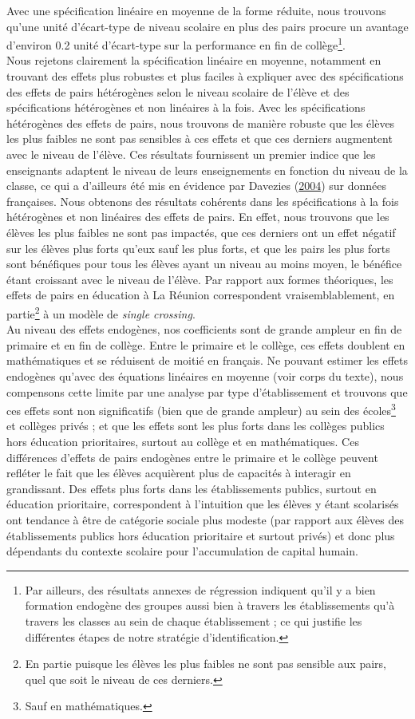 \documentclass[
]{book}
\begin{document}
\quad Avec une spécification linéaire en moyenne de la forme réduite, nous trouvons qu'une unité d'écart-type de niveau scolaire en plus des pairs procure un avantage d'environ 0.2 unité d'écart-type sur la performance en fin de collège\footnote{Par ailleurs, des résultats annexes de régression indiquent qu'il y a bien formation endogène des groupes aussi bien à travers les établissements qu'à travers les classes au sein de chaque établissement ; ce qui justifie les différentes étapes de notre stratégie d'identification.}.\\
Nous rejetons clairement la spécification linéaire en moyenne, notamment en trouvant des effets plus robustes et plus faciles à expliquer avec des spécifications des effets de pairs hétérogènes selon le niveau scolaire de l'élève et des spécifications hétérogènes et non linéaires à la fois. Avec les spécifications hétérogènes des effets de pairs, nous trouvons de manière robuste que les élèves les plus faibles ne sont pas sensibles à ces effets et que ces derniers augmentent avec le niveau de l'élève. Ces résultats fournissent un premier indice que les enseignants adaptent le niveau de leurs enseignements en fonction du niveau de la classe, ce qui a d'ailleurs été mis en évidence par Davezies (\protect\hyperlink{ref-DAV:04}{2004}) sur données françaises. Nous obtenons des résultats cohérents dans les spécifications à la fois hétérogènes et non linéaires des effets de pairs. En effet, nous trouvons que les élèves les plus faibles ne sont pas impactés, que ces derniers ont un effet négatif sur les élèves plus forts qu'eux sauf les plus forts, et que les pairs les plus forts sont bénéfiques pour tous les élèves ayant un niveau au moins moyen, le bénéfice étant croissant avec le niveau de l'élève. Par rapport aux formes théoriques, les effets de pairs en éducation à La Réunion correspondent vraisemblablement, en partie\footnote{En partie puisque les élèves les plus faibles ne sont pas sensible aux pairs, quel que soit le niveau de ces derniers.} à un modèle de \emph{single crossing}.\\
Au niveau des effets endogènes, nos coefficients sont de grande ampleur en fin de primaire et en fin de collège. Entre le primaire et le collège, ces effets doublent en mathématiques et se réduisent de moitié en français. Ne pouvant estimer les effets endogènes qu'avec des équations linéaires en moyenne (voir corps du texte), nous compensons cette limite par une analyse par type d'établissement et trouvons que ces effets sont non significatifs (bien que de grande ampleur) au sein des écoles\footnote{Sauf en mathématiques.} et collèges privés ; et que les effets sont les plus forts dans les collèges publics hors éducation prioritaires, surtout au collège et en mathématiques. Ces différences d'effets de pairs endogènes entre le primaire et le collège peuvent refléter le fait que les élèves acquièrent plus de capacités à interagir en grandissant. Des effets plus forts dans les établissements publics, surtout en éducation prioritaire, correspondent à l'intuition que les élèves y étant scolarisés ont tendance à être de catégorie sociale plus modeste (par rapport aux élèves des établissements publics hors éducation prioritaire et surtout privés) et donc plus dépendants du contexte scolaire pour l'accumulation de capital humain.
\end{document}
